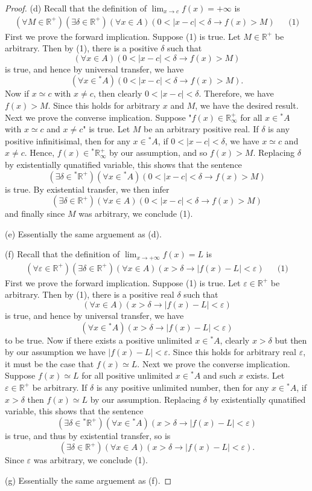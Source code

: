 \documentclass[a4paper, 11pt, openany]{book}
\theoremstyle{plain}
\theoremstyle{plain}
\newcommand{\arr}{\rightarrow}
\newcommand{\R}{\mathbb{R}}
\newcommand{\ep}{\varepsilon}
\newcommand{\del}{\delta}
\newcommand{\hyp}{{}^*}
\begin{document}
\begin{proof}
    (d) Recall that the definition of $\lim_{x \arr c} f(x) = + \infty$ is 
    \begin{align*}
      (\forall M \in \R^+)(\exists \del \in \R^+)(\forall x \in A)(0<|x-c|<\del \arr f(x)>M) & & \text{(1)}
    \end{align*}
    First we prove the forward implication. Suppose (1) is true. Let $M \in \R^+$ be arbitrary. Then by (1), there is a positive $\del$ such that $$(\forall x \in A)(0<|x-c|<\del \arr f(x)>M)$$ is true, and hence by universal transfer, we have $$(\forall x \in \hyp A)(0<|x-c|< \del \arr f(x)>M).$$ Now if $x \simeq c$ with $x \not = c$, then clearly $0<|x-c|<\del$. Therefore, we have $f(x)>M$. Since this holds for arbitrary $x$ and $M$, we have the desired result. Next we prove the converse implication. Suppose "$f(x) \in \R_\infty^+$ for all $x \in \hyp A$ with $x \simeq c$ and $x \not =c$" is true. Let $M$ be an arbitrary positive real. If $\del$ is any positive infinitisimal, then for any $x \in \hyp A$, if $0<|x-c|<\del$, we have $x \simeq c$ and $x \not = c$. Hence, $f(x) \in \hyp \R_\infty^+$ by our assumption, and so $f(x)>M$. Replacing $\del$ by existentially qunatified variable, this shows that the sentence $$(\exists \del \in \hyp \R^+)(\forall x \in \hyp A)(0<|x-c|<\del \arr f(x)>M)$$ is true. By existential transfer, we then infer $$(\exists \del \in \R^+)(\forall x \in A)(0<|x-c|<\del \arr f(x)>M)$$ and finally since $M$ was arbitrary, we conclude (1). 

    (e) Essentially the same arguement as (d).

    (f) Recall that the definition of $\lim_{x \arr + \infty} f(x)=L$ is \begin{align*}
    (\forall \ep \in \R^+)(\exists \del \in \R^+)(\forall x \in A)(x>\del \arr |f(x)-L|<\ep) & & \text{(1)} 
    \end{align*}
    First we prove the forward implication. Suppose (1) is true. Let $\ep \in \R^+$ be arbitrary. Then by (1), there is a positive real $\delta$ such that $$(\forall x \in A)(x>\del \arr |f(x)-L|<\ep)$$ is true, and hence by universal transfer, we have $$(\forall x \in \hyp A)(x>\del \arr |f(x)-L|<\ep)$$ to be true. Now if there exists a positive unlimited $x \in \hyp A$, clearly $x>\del$ but then by our assumption we have $|f(x)-L|<\ep$. Since this holds for arbitrary real $\ep$, it must be the case that $f(x) \simeq L$. Next we prove the converse implication. Suppose $f(x) \simeq L$ for all positive unlimited $x \in \hyp A$ and such $x$ exists. Let $\ep \in \R^+$ be arbitrary. If $\del$ is any positive unlimited number, then for any $x \in \hyp A$, if $x>\del$ then $f(x) \simeq L$ by our assumption. Replacing $\del$ by existentially qunatified variable, this shows that the sentence $$(\exists \del \in \hyp \R^+) (\forall x \in \hyp A)(x>\del \arr |f(x)-L|<\ep)$$ is true, and thus by existential transfer, so is $$(\exists \del \in \R^+)(\forall x \in A)(x>\del \arr |f(x)-L|<\ep).$$ Since $\ep $ was arbitrary, we conclude (1).

    (g) Essentially the same arguement as (f).
  \end{proof}
  
\end{document}
